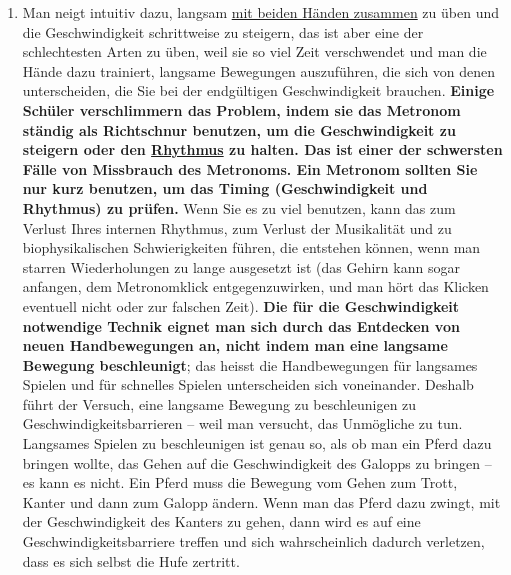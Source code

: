 \begin{enumerate}[label={\arabic*.}]
\item Man neigt intuitiv dazu, langsam \hyperref[c1ii25]{mit beiden Händen zusammen} zu üben und die Geschwindigkeit schrittweise zu steigern, das ist aber eine der schlechtesten Arten zu üben, weil sie so viel Zeit verschwendet und man die Hände dazu trainiert, langsame Bewegungen auszuführen, die sich von denen unterscheiden, die Sie bei der endgültigen Geschwindigkeit brauchen.
\textbf{Einige Schüler verschlimmern das Problem, indem sie das Metronom ständig  als Richtschnur benutzen, um die Geschwindigkeit zu steigern oder den \hyperref[c1iii1b]{Rhythmus} zu halten.
Das ist einer der schwersten Fälle von Missbrauch des Metronoms.
Ein Metronom sollten Sie nur kurz benutzen, um das Timing (Geschwindigkeit und Rhythmus) zu prüfen.}
Wenn Sie es zu viel benutzen, kann das zum Verlust Ihres internen Rhythmus, zum Verlust der Musikalität und zu biophysikalischen Schwierigkeiten führen, die entstehen können, wenn man starren Wiederholungen zu lange ausgesetzt ist (das Gehirn kann sogar anfangen, dem Metronomklick entgegenzuwirken, und man hört das Klicken eventuell nicht oder zur falschen Zeit).
\textbf{Die für die Geschwindigkeit notwendige Technik eignet man sich durch das Entdecken von neuen Handbewegungen an, nicht indem man eine langsame Bewegung beschleunigt}; das heisst die Handbewegungen für langsames Spielen und für schnelles Spielen unterscheiden sich voneinander.
Deshalb führt der Versuch, eine langsame Bewegung zu beschleunigen zu Geschwindigkeitsbarrieren -- weil man versucht, das Unmögliche zu tun.
Langsames Spielen zu beschleunigen ist genau so, als ob man ein Pferd dazu bringen wollte, das Gehen auf die Geschwindigkeit des Galopps zu bringen -- es kann es nicht.
Ein Pferd muss die Bewegung vom Gehen zum Trott, Kanter und dann zum Galopp ändern.
Wenn man das Pferd dazu zwingt, mit der Geschwindigkeit des Kanters zu gehen, dann wird es auf eine Geschwindigkeitsbarriere treffen und sich wahrscheinlich dadurch verletzen, dass es sich selbst die Hufe zertritt.


\end{enumerate}
